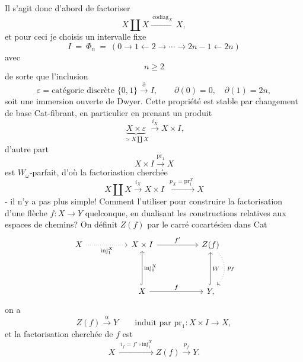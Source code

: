 \documentclass[11pt]{article}
\newcommand{\printedpage}[1]{{\reversemarginpar\marginnote{\raggedleft\scriptsize ed.~#1}}}
\newcommand{\msp}[1]{\marginpar{\raggedright\scriptsize ms.~#1}}
\begin{document}
Il s'agit donc d'abord de factoriser
\[
X \amalg X \xrightarrow{\ \mathrm{codiag}_X\ } X,
\]
et pour ceci je choisis un intervalle fixe
\[
I \ = \ \Phi_n \ = \ (0 \longrightarrow 1 \longleftarrow 2 \longrightarrow \cdots \longrightarrow 2n-1 \longleftarrow 2n)
\]
avec
\[
n \geq 2
\]
de sorte que l'inclusion
\[
\varepsilon = \text{catégorie discrète } \{0,1\} \xrightarrow{\partial} I, \qquad \partial(0) = 0, \quad \partial(1) = 2n,
\]
soit une immersion ouverte de Dwyer. Cette propriété est stable par changement de base Cat-fibrant, en particulier en prenant un produit
\[
\underbrace{X \times \varepsilon}_{\simeq X \coprod X} \xrightarrow{i_X} X \times I,
\]
\begingroup\renewcommand{\thefootnote}{}\endgroup
\printedpage{146}
\msp{page 229}
d'autre part
\[
X \times I \xrightarrow{\mathrm{pr}_1} X
\]
est $W_\omega$-parfait, d'où la factoriastion cherchée %
\[
X \amalg X \xrightarrow{i_X} X \times I \ \xrightarrow{\ p_X = \mathrm{pr}_1^X\ } X
\]
- il n'y a pas plus simple! Comment l'utiliser pour construire la factorisation d'une flèche $f : X \longrightarrow Y$ quelconque, en dualisant les constructions relatives aux espaces de chemins? On définit $Z(f)$ par le carré cocartésien dans Cat
\[
\begin{tikzcd}[column sep=5em, row sep=4em]
X \arrow[r, dotted, "\mathrm{inj}_1^X"'] & X \times I \arrow[r, "f'"] & Z(f) \arrow[d, dotted, bend left=45, "\,p_f"] \\
& X \arrow[u, hook, "\mathrm{inj}_0^X"'] \arrow[r, "f"] & Y, \arrow[u, hook, "W"']
\end{tikzcd}
\]
on a
\[
Z(f) \xrightarrow{\alpha} Y \qquad \text{induit par } \mathrm{pr}_1 : X \times I \longrightarrow X,
\]
et la factorisation cherchée de $f$ est
\[
X \ \xrightarrow{\ i_f = f' \circ \mathrm{inj}_1^X\ } Z(f) \xrightarrow{p_f} Y.
\]
\end{document}
